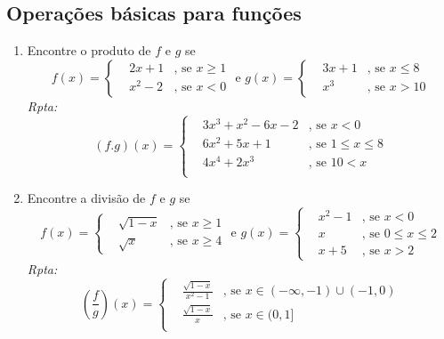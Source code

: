 \documentclass[latin,20pt]{article}
\begin{document}
 \subsection{Operações básicas para funções}
     \begin{enumerate}
    \item Encontre o produto de $f$ e $g$ se 
    $$
    f(x)= \left\{  
            \begin{array}{lll}
            &2x+1  &\text{, se } x\geq 1\\
            &x^2-2 &\text{, se } x<0
            \end{array}
            \right.
     \text{ e }
    g(x)= \left\{  
            \begin{array}{lll}
            &3x+1  &\text{, se } x\leq 8\\
            &x^3   &\text{, se } x>10
            \end{array}
            \right. 
    $$
    {\it Rpta:} 
     $$
    (f.g)(x)= \left\{  
            \begin{array}{lll}
            &3x^3+x^2-6x-2  &\text{, se } x<0\\
            &6x^2+5x+1      &\text{, se } 1\leq x \leq 8 \\
            &4x^4+2x^3      &\text{, se } 10< x \\
            \end{array}
            \right. 
    $$
    \item Encontre a divisão de $f$ e $g$ se 
    $$
    f(x)= \left\{  
            \begin{array}{lll}
            &\sqrt{1-x}  &\text{, se } x\geq 1\\
            &\sqrt{x} &\text{, se } x\geq 4
            \end{array}
            \right.
     \text{ e }
    g(x)= \left\{  
            \begin{array}{lll}
            &x^2-1  &\text{, se } x<0\\
            &x   &\text{, se } 0\leq x \leq 2 \\
            &x+5 &\text{, se } x>2
            \end{array}
            \right. 
    $$
    {\it Rpta:} 
     $$
    (\frac{f}{g})(x)= \left\{  
            \begin{array}{lll}
    &\frac{\sqrt{1-x}}{x^2-1} &\text{, se } x \in (-\infty, -1)\cup (-1,0)\\
    &\frac{\sqrt{1-x}}{x}     &\text{, se } x \in (0,1] \\

\end{array}$$
\end{enumerate}
\end{document}
